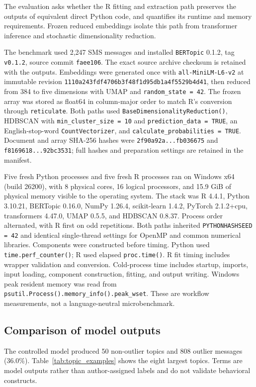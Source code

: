 \documentclass[12pt]{article}
\newcommand{\pkg}[1]{\texttt{#1}}
\newcommand{\code}[1]{\texttt{#1}}
\newcommand{\fcode}[1]{\nolinkurl{#1}}
\begin{document}
The evaluation asks whether the R fitting and extraction path preserves the outputs of equivalent direct Python code, and quantifies its runtime and memory requirements. Frozen reduced embeddings isolate this path from transformer inference and stochastic dimensionality reduction.

The benchmark used 2,247 SMS messages and installed \pkg{BERTopic} 0.1.2, tag \fcode{v0.1.2}, source commit \fcode{faee106}. The exact source archive checksum is retained with the outputs. Embeddings were generated once with \fcode{all-MiniLM-L6-v2} at immutable revision \fcode{1110a243fdf4706b3f48f1d95db1a4f5529b4d41}, then reduced from 384 to five dimensions with UMAP and \fcode{random_state = 42}. The frozen array was stored as float64 in column-major order to match R's conversion through \pkg{reticulate}. Both paths used \fcode{BaseDimensionalityReduction()}, HDBSCAN with \fcode{min_cluster_size = 10} and \fcode{prediction_data = TRUE}, an English-stop-word \fcode{CountVectorizer}, and \fcode{calculate_probabilities = TRUE}. Document and array SHA-256 hashes were \fcode{2f90a92a...fb036675} and \fcode{f8169618...92bc3531}; full hashes and preparation settings are retained in the manifest.

Five fresh Python processes and five fresh R processes ran on Windows x64 (build 26200), with 8 physical cores, 16 logical processors, and 15.9 GiB of physical memory visible to the operating system. The stack was R 4.4.1, Python 3.10.21, BERTopic 0.16.0, NumPy 1.26.4, scikit-learn 1.4.2, PyTorch 2.1.2+cpu, transformers 4.47.0, UMAP 0.5.5, and HDBSCAN 0.8.37. Process order alternated, with R first on odd repetitions. Both paths inherited \fcode{PYTHONHASHSEED = 42} and identical single-thread settings for OpenMP and common numerical libraries. Components were constructed before timing. Python used \code{time.perf\_counter()}; R used elapsed \code{proc.time()}. R fit timing includes wrapper validation and conversion. Cold-process time includes startup, imports, input loading, component construction, fitting, and output writing. Windows peak resident memory was read from \fcode{psutil.Process().memory_info().peak_wset}. These are workflow measurements, not a language-neutral microbenchmark.

\subsection{Comparison of model outputs}

The controlled model produced 50 non-outlier topics and 808 outlier messages (36.0\%). Table~\ref{tab:topic_examples} shows the eight largest topics. Terms are model outputs rather than author-assigned labels and do not validate behavioral constructs.
\end{document}
